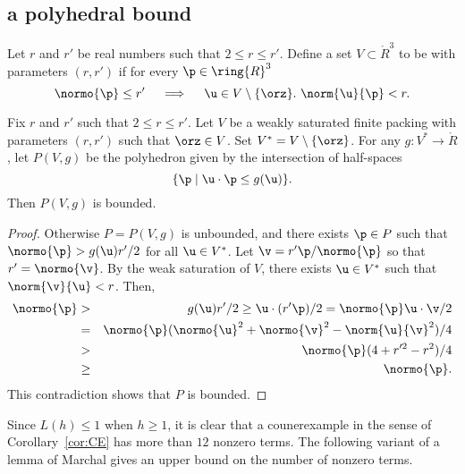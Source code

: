 \subsection{a polyhedral bound}

\begin{definition}
Let $r$ and $r'$ be real numbers such that $2\le r\le r'$.  Define a
set $ V\subset\ring{R}^3$ to be  with
parameters $(r,r')$ if for every $\p\in\ring{R}^3$
\begin{displaymath}
\normo{\p}\le r'~~~\implies~~~  \u\in V\setminus\{\orz\}.~\norm{ \u}{\p}< r.
\end{displaymath}
\end{definition}

\begin{lemma}\label{lemma:poly-bounded} 
Fix $r$ and $r'$ such that $2\le r\le r'$.
Let $ V$ be a weakly saturated finite packing with parameters $(r,r')$ 
such that $\orz\in  V$.
Set $ V^*= V\setminus\{\orz\}$.
For any $g: V^*\to\ring{R}$, let $P( V,g)$ be the
polyhedron given by the intersection of half-spaces
\begin{displaymath}
\{\p \mid  \u\cdot \p \le g( \u)\}.
\end{displaymath}
Then $P( V,g)$ is bounded.
\end{lemma}
%

\begin{proof} Otherwise $P=P( V,g)$ is unbounded, and there exists
$\p\in P$ such that $\normo{\p} > g( \u) r'/2$ for all $ \u\in V^*$.
Let $\v = r' \p/\normo{\p}$ so that $r'=\normo{\v}$.  By the weak
saturation of $ V$, there exists $ \u\in V^*$ such that $\norm{\v}{
\u}<r$.  Then,
\begin{eqnarray*}
\normo{\p} &>& g( \u) r'/2 \ge  \u\cdot (r' \p)/2 = \normo{\p}  \u\cdot \v /2\\
&=& \normo{\p} (\normo{ \u}^2 + \normo{\v}^2 - \norm{ \u}{\v}^2)/4\\
&>& \normo{\p}(4+r'^2-r^2)/4\\
&\ge& \normo{\p}.
\end{eqnarray*}
This contradiction shows that $P$ is bounded.
\end{proof}




Since $L(h)\le 1$ when $h\ge1$, it is clear that a counerexample in
the sense of Corollary~\ref{cor:CE} has more than $12$ nonzero terms.
The following variant of a lemma of Marchal gives an upper bound on
the number of nonzero terms.


